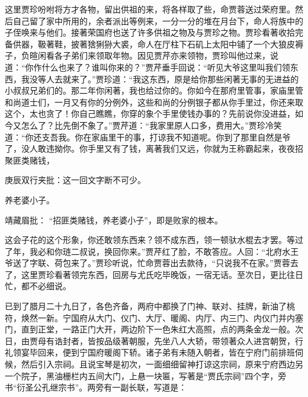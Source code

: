 \begin{parag}


    这里贾珍吩咐将方才各物，留出供祖的来，将各样取了些，命贾蓉送过荣府里。然后自己留了家中所用的，余者派出等例来，一分一分的堆在月台下，命人将族中的子侄唤来与他们。接著荣国府也送了许多供祖之物及与贾珍之物。贾珍看著收拾完备供器，靸著鞋，披著猞猁狲大裘，命人在厅柱下石矶上太阳中铺了一个大狼皮褥子，负暄闲看各子弟们来领取年物。因见贾芹亦来领物，贾珍叫他过来，说道：“你作什么也来了？谁叫你来的？”贾芹垂手回说：“听见大爷这里叫我们领东西，我没等人去就来了。”贾珍道：“我这东西，原是给你那些闲著无事的无进益的小叔叔兄弟们的。那二年你闲著，我也给过你的。你如今在那府里管事，家庙里管和尚道士们，一月又有你的分例外，这些和尚的分例银子都从你手里过，你还来取这个，太也贪了！你自己瞧瞧，你穿的象个手里使钱办事的？先前说你没进益，如今又怎么了？比先倒不象了。”贾芹道：“我家里原人口多，费用大。”贾珍冷笑道：“你还支吾我。你在家庙里干的事，打谅我不知道呢。你到了那里自然是爷了，没人敢违拗你。你手里又有了钱，离著我们又远，你就为王称霸起来，夜夜招聚匪类赌钱，\begin{note}庚辰双行夹批：这一回文字断不可少。\end{note}养老婆小子。\begin{note}靖藏眉批： “招匪类赌钱，养老婆小子”，即是败家的根本。\end{note}这会子花的这个形象，你还敢领东西来？领不成东西，领一顿驮水棍去才罢。等过了年，我必和你琏二叔说，换回你来。”贾芹红了脸，不敢答应。人回：“北府水王爷送了字联、荷包来了。”贾珍听说，忙命贾蓉出去款待，“只说我不在家。”贾蓉去了，这里贾珍看著领完东西，回房与尤氏吃毕晚饭，一宿无话。至次日，更比往日忙，都不必细说。
\end{parag}


\begin{parag}


    已到了腊月二十九日了，各色齐备，两府中都换了门神、联对、挂牌，新油了桃符，焕然一新。宁国府从大门、仪门、大厅、暖阁、内厅、内三门、内仪门并内塞门，直到正堂，一路正门大开，两边阶下一色朱红大高照，点的两条金龙一般。次日，由贾母有诰封者，皆按品级著朝服，先坐八人大轿，带领著众人进宫朝贺，行礼领宴毕回来，便到宁国府暖阁下轿。诸子弟有未随入朝者，皆在宁府门前排班伺候，然后引入宗祠。且说宝琴是初次，一面细细留神打谅这宗祠，原来宁府西边另一个院子，黑油栅栏内五间大门，上悬一块匾，写著是“贾氏宗祠”四个字，旁书“衍圣公孔继宗书”。两旁有一副长联，写道是：
\end{parag}

